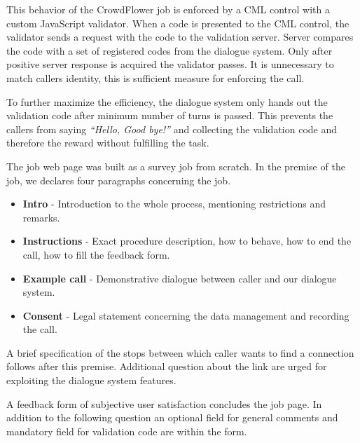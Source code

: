 This behavior of the CrowdFlower job is enforced by a CML control with a custom JavaScript validator.
When a code is presented to the CML control, the validator sends a request with the code to the validation server.
Server compares the code with a set of registered codes from the dialogue system.
Only after positive server response is acquired the validator passes.
It is unnecessary to match callers identity, this is sufficient measure for enforcing the call.

To further maximize the efficiency, the dialogue system only hands out the validation code after minimum number of turns is passed. %
This prevents the callers from saying \textit{``Hello, Good bye!''} and collecting the validation code and therefore the reward without fulfilling the task.

The job web page was built as a survey job from scratch.
In the premise of the job, we declares four paragraphs concerning the job.

\begin{itemize}
	\item \textbf{Intro} - Introduction to the whole process, mentioning restrictions and remarks. %
	\item \textbf{Instructions} - Exact procedure description,  how to behave, how to end the call, how to fill the feedback form.
	\item \textbf{Example call} - Demonstrative dialogue between caller and our dialogue system.
	\item \textbf{Consent} - Legal statement concerning the data management and recording the call.
\end{itemize}

A brief specification of the stops between which caller wants to find a connection follows after this premise.
Additional question about the link are urged for exploiting the dialogue system features.

A feedback form of subjective user satisfaction concludes the job page.
In addition to the following question an optional field for general comments and mandatory field for validation code are within the form.

